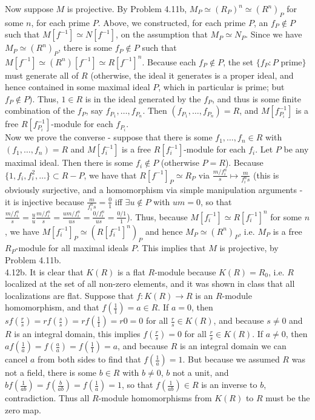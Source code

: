 \documentclass[11pt]{article}
\begin{document}
Now suppose $M$ is projective. By Problem 4.11b, $M_P\simeq (R_P)^n\simeq (R^n)_P$ for some $n$, for each prime $P$. Above, we constructed, for each prime $P$, an $f_P\notin P$ such that $M[f^{-1}]\simeq N[f^{-1}]$, on the assumption that $M_P\simeq N_P$. Since we have $M_P\simeq (R^n)_P$, there is some $f_P\notin P$ such that $M[f^{-1}]\simeq (R^n)[f^{-1}]\simeq R[f^{-1}]^n$. Because each $f_P\notin P$, the set $\{f_P: P\text{ prime}\}$ must generate all of $R$ (otherwise, the ideal it generates is a proper ideal, and hence contained in some maximal ideal $P$, which in particular is prime; but $f_P\notin P$). Thus, $1\in R$ is in the ideal generated by the $f_P$, and thus is some finite combination of the $f_P$, say $f_{P_1},\ldots,f_{P_n}$. Then $(f_{P_1},\ldots,f_{P_n})=R$, and $M[f_{P_i}^{-1}]$ is a free $R[f_{P_i}^{-1}]$-module for each $f_{P_i}$.\\

Now we prove the converse - suppose that there is some $f_1,\ldots,f_n\in R$ with $(f_1,\ldots,f_n)=R$ and $M[f_i^{-1}]$ is a free $R[f_i^{-1}]$-module for each $f_i$. Let $P$ be any maximal ideal. Then there is some $f_i\notin P$ (otherwise $P=R$). Because $\{1,f_i,f_i^2,\ldots\}\subset R-P$, we have that $R[f^{-1}]_P\simeq R_P$ via $\frac{m/f_i^n}{s}\mapsto \frac{m}{f_i^ns}$ (this is obviously surjective, and a homomorphism via simple manipulation arguments - it is injective because $\frac{m}{f_i^ns}=\frac{0}{1}$ iff $\exists u\notin P$ with $um=0$, so that $\frac{m/f_i^n}{s}=\frac{u}{u}\frac{m/f_i^n}{s}=\frac{um/f_i^n}{us}=\frac{0/f_i^n}{us}=\frac{0/1}{1}$). Thus, because $M[f_i^{-1}]\simeq R[f_i^{-1}]^n$ for some $n$, we have $M[f_i^{-1}]_P\simeq (R[f_i^{-1}]^n)_P$ and hence $M_P\simeq (R^n)_P$, i.e. $M_P$ is a free $R_P$-module for all maximal ideals $P$. This implies that $M$ is projective, by Problem 4.11b.   \\

\num{4.12b.} It is clear that $K(R)$ is a flat $R$-module because $K(R)=R_0$, i.e. $R$ localized at the set of all non-zero elements, and it was shown in class that all localizations are flat. Suppose that $f:K(R)\rightarrow R$ is an $R$-module homomorphism, and that $f(\frac{1}{1})=a\in R$. If $a=0$, then $sf(\frac{r}{s})=rf(\frac{s}{s})=rf(\frac{1}{1})=r0=0$ for all $\frac{r}{s}\in K(R)$, and because $s\neq 0$ and $R$ is an integral domain, this implies $f(\frac{r}{s})=0$ for all $\frac{r}{s}\in K(R)$. If $a\neq 0$, then $af(\frac{1}{a})=f(\frac{a}{a})=f(\frac{1}{1})=a$, and because $R$ is an integral domain we can cancel $a$ from both sides to find that $f(\frac{1}{a})=1$. But because we assumed $R$ was not a field, there is some $b\in R$ with $b\neq0$, $b$ not a unit, and $bf(\frac{1}{ab})=f(\frac{b}{ab})=f(\frac{1}{a})=1$, so that $f(\frac{1}{ab})\in R$ is an inverse to $b$, contradiction. Thus all $R$-module homomorphisms from $K(R)$ to $R$ must be the zero map.\\
\end{document}
